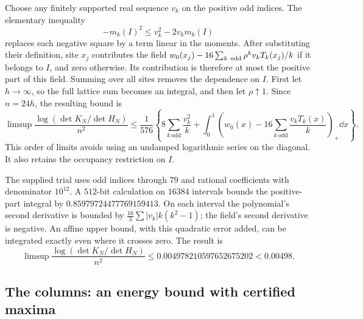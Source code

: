 Choose any finitely supported real sequence $v_k$ on the positive
odd indices. The elementary inequality
\[
 -m_k(I)^2\le v_k^2-2v_km_k(I)
\]
replaces each negative square by a term linear in the moments.
After substituting their definition, site $x_j$ contributes the field
$w_0(x_j)-16\sum_{k\ {\rm odd}}\rho^kv_kT_k(x_j)/k$ if it belongs
to $I$, and zero otherwise. Its contribution is therefore at most
the positive part of this field. Summing over all sites removes the
dependence on $I$. First let $h\to\infty$, so the full lattice sum
becomes an integral, and then let $\rho\uparrow1$. Since $n=24h$,
the resulting bound is
\begin{equation}\label{eq:repair-dual}
 \limsup\frac{\log(\det K_N/\det H_N)}{n^2}
 \le\frac1{576}\left\{
 8\sum_{k\ \mathrm{odd}}\frac{v_k^2}{k}
 +\int_0^1\left(w_0(x)-16\sum_{k\ \mathrm{odd}}\frac{v_kT_k(x)}k\right)_+\dd x
 \right\}.
\end{equation}
This order of limits avoids using an undamped logarithmic series on
the diagonal. It also retains the occupancy restriction on $I$.

The supplied trial uses odd indices through $79$ and rational
coefficients with denominator $10^{12}$. A $512$-bit calculation on
$16384$ intervals bounds the positive-part integral by
$0.85979724477769159413$. On each interval the polynomial's second
derivative is bounded by
$\frac{16}{3}\sum |v_k|k(k^2-1)$; the field's second derivative is
negative. An affine upper bound, with this quadratic error added,
can be integrated exactly even where it crosses zero. The result is
\begin{equation}\label{eq:repair-rate}
 \limsup\frac{\log(\det K_N/\det H_N)}{n^2}
 \le0.004978210597652675202<0.00498.
\end{equation}

\subsection{The columns: an energy bound with certified maxima}

